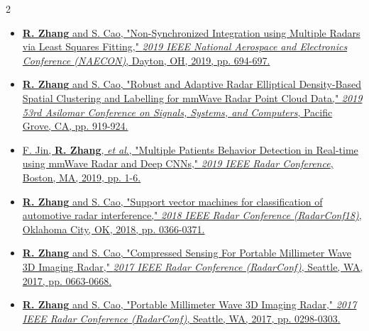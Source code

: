\documentclass[10pt,letter,ragged2e,withhyper]{leozhang}
\newcommand{\etal}{\textit{et al}.}
\begin{document}
\begin{paracol}{2}
\begin{itemize}
  \item \href{https://ieeexplore.ieee.org/abstract/document/9058256}{{\bf R. Zhang} and S. Cao, "Non-Synchronized Integration using Multiple Radars via Least Squares Fitting," {\it 2019 IEEE National Aerospace and Electronics Conference (NAECON)}, Dayton, OH, 2019, pp. 694-697.}
  \item \href{https://ieeexplore.ieee.org/abstract/document/9048869}{{\bf R. Zhang} and S. Cao, "Robust and Adaptive Radar Elliptical Density-Based Spatial Clustering and Labelling for mmWave Radar Point Cloud Data," {\it 2019 53rd Asilomar Conference on Signals, Systems, and Computers}, Pacific Grove, CA, pp. 919-924.}
  \item \href{https://ieeexplore.ieee.org/document/8835656}{F. Jin, {\bf R. Zhang}, \etal{}, "Multiple Patients Behavior Detection in Real-time using mmWave Radar and Deep CNNs," {\it 2019 IEEE Radar Conference}, Boston, MA, 2019, pp. 1-6.}
  \item \href{https://ieeexplore.ieee.org/abstract/document/8378586}{{\bf R. Zhang} and S. Cao, "Support vector machines for classification of automotive radar interference," {\it 2018 IEEE Radar Conference (RadarConf18)}, Oklahoma City, OK, 2018, pp. 0366-0371.}
  \item \href{http://ieeexplore.ieee.org/document/7944286}{{\bf R. Zhang} and S. Cao, "Compressed Sensing For Portable Millimeter Wave 3D Imaging Radar," {\it 2017 IEEE Radar Conference (RadarConf)}, Seattle, WA, 2017, pp. 0663-0668.}
  \item \href{http://ieeexplore.ieee.org/abstract/document/7944216}{{\bf R. Zhang} and S. Cao, "Portable Millimeter Wave 3D Imaging Radar," {\it 2017 IEEE Radar Conference (RadarConf)}, Seattle, WA, 2017, pp. 0298-0303.}
\end{itemize}





\end{paracol}
\end{document}
